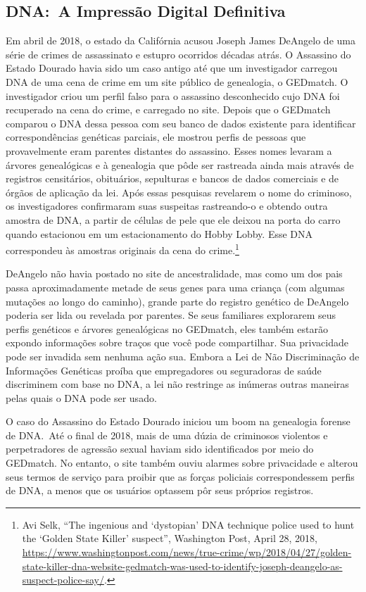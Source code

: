 \documentclass{book}
\begin{document}
\subsection{DNA:~A Impressão Digital Definitiva}
\label{cap3:quem-pegadas-dna}
Em abril de 2018, o estado da Califórnia acusou Joseph James DeAngelo de uma
série de crimes de assassinato e estupro ocorridos décadas atrás. O Assassino
do Estado Dourado havia sido um caso antigo até que um investigador carregou
DNA de uma cena de crime em um site público de genealogia, o GEDmatch. O
investigador criou um perfil falso para o assassino desconhecido cujo DNA
foi recuperado na cena do crime, e carregado no site. Depois que o GEDmatch comparou o DNA dessa pessoa
com seu banco de dados existente para identificar correspondências genéticas
parciais, ele mostrou perfis de pessoas que provavelmente eram parentes
distantes do assassino. Esses nomes levaram a árvores genealógicas e à
genealogia que pôde ser rastreada ainda mais através de registros censitários,
obituários, sepulturas e bancos de dados comerciais e de órgãos de aplicação da
lei. Após essas pesquisas revelarem o nome do criminoso, os investigadores
confirmaram suas suspeitas rastreando-o e obtendo outra amostra de DNA, a
partir de células de pele que ele deixou na porta do carro quando estacionou
em um estacionamento do Hobby Lobby. Esse DNA correspondeu às amostras
originais da cena do crime.\footnote{Avi Selk, ``The ingenious and `dystopian'
DNA technique police used to hunt the `Golden State Killer' suspect'',
Washington Post, April 28, 2018,
\url{https://www.washingtonpost.com/news/true-crime/wp/2018/04/27/golden-state-killer-dna-website-gedmatch-was-used-to-identify-joseph-deangelo-as-suspect-police-say/}.}

DeAngelo não havia postado no site de ancestralidade, mas como um dos pais
passa aproximadamente metade de seus genes para uma criança (com algumas
mutações ao longo do caminho), grande parte do registro genético de DeAngelo
poderia ser lida ou revelada por parentes. Se seus familiares explorarem seus
perfis genéticos e árvores genealógicas no GEDmatch, eles também estarão
expondo informações sobre traços que você pode compartilhar. Sua privacidade
pode ser invadida sem nenhuma ação sua. Embora a Lei de Não Discriminação de
Informações Genéticas proíba que empregadores ou seguradoras de saúde
discriminem com base no DNA, a lei não restringe as inúmeras outras maneiras
pelas quais o DNA pode ser usado.

O caso do Assassino do Estado Dourado iniciou um boom na genealogia forense de
DNA.~Até o final de 2018, mais de uma dúzia de criminosos violentos e
perpetradores de agressão sexual haviam sido identificados por meio do
GEDmatch. No entanto, o site também ouviu alarmes sobre privacidade e alterou
seus termos de serviço para proibir que as forças policiais correspondessem
perfis de DNA, a menos que os usuários optassem pôr seus próprios registros.
\end{document}
